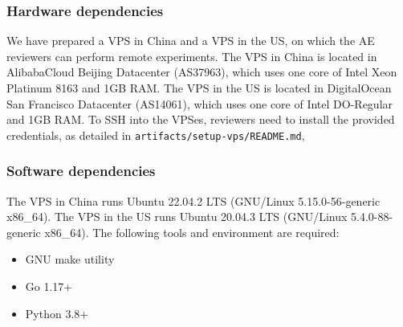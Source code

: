 \subsubsection{Hardware dependencies}

We have prepared a VPS in China and a VPS in the US,
on which the AE reviewers can perform remote experiments.
%
The VPS in China is located in AlibabaCloud Beijing Datacenter (AS37963),
which uses one core of Intel Xeon Platinum 8163 and 1GB RAM.
The VPS in the US is located in DigitalOcean San Francisco Datacenter (AS14061),
which uses one core of Intel DO-Regular and 1GB RAM.
To SSH into the VPSes, reviewers need to install the provided credentials,
as detailed in \texttt{artifacts/setup-vps/README.md}, 

\subsubsection{Software dependencies}

The VPS in China runs Ubuntu 22.04.2 LTS (GNU/Linux 5.15.0-56-generic x86\_64).
The VPS in the US runs Ubuntu 20.04.3 LTS (GNU/Linux 5.4.0-88-generic x86\_64).
The following tools and environment are required:

\begin{itemize}
    \item GNU make utility
    \item Go 1.17+
    \item Python 3.8+
\end{itemize}


